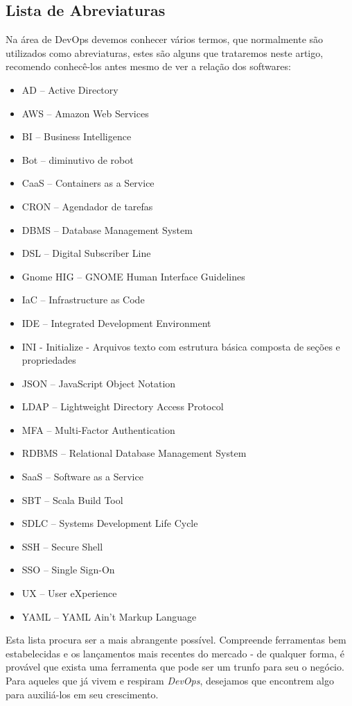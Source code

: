 \documentclass[fleqn,10pt]{../sty/SelfArx} %
\begin{document}
\subsection*{Lista de Abreviaturas}
Na área de DevOps devemos conhecer vários termos, que normalmente são utilizados como abreviaturas, estes são alguns que trataremos neste artigo, recomendo conhecê-los antes mesmo de ver a relação dos softwares: \begin{itemize}[nolistsep]
	\item AD -- Active Directory
	\item AWS -- Amazon Web Services
	\item BI -- Business Intelligence
	\item Bot -- diminutivo de robot
	\item CaaS -- Containers as a Service
	\item CRON -- Agendador de tarefas
	\item DBMS -- Database Management System
	\item DSL -- Digital Subscriber Line
	\item Gnome HIG -- GNOME Human Interface Guidelines
	\item IaC -- Infrastructure as Code
	\item IDE -- Integrated Development Environment
	\item INI - Initialize - Arquivos texto com estrutura básica composta de seções e propriedades
	\item JSON -- JavaScript Object Notation
	\item LDAP -- Lightweight Directory Access Protocol
	\item MFA -- Multi-Factor Authentication
	\item RDBMS -- Relational Database Management System
	\item SaaS -- Software as a Service
	\item SBT -- Scala Build Tool 
	\item SDLC -- Systems Development Life Cycle
	\item SSH -- Secure Shell
	\item SSO -- Single Sign-On
	\item UX -- User eXperience
	\item YAML -- YAML Ain't Markup Language
\end{itemize}

Esta lista procura ser a mais abrangente possível. Compreende ferramentas bem estabelecidas e os lançamentos mais recentes do mercado - de qualquer forma, é provável que exista uma ferramenta que pode ser um trunfo para seu o negócio. Para aqueles que já vivem e respiram \textit{DevOps}, desejamos que encontrem algo para auxiliá-los em seu crescimento.
\end{document}
